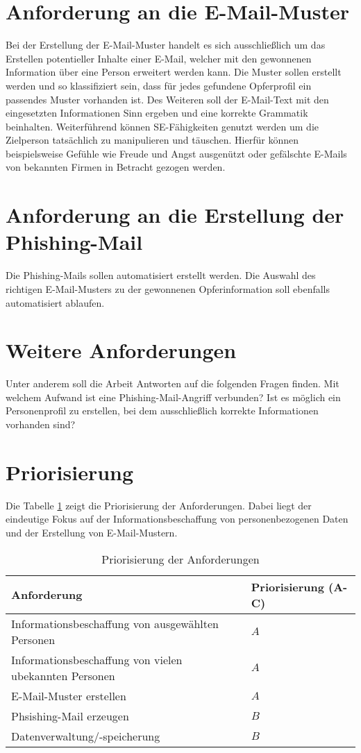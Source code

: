 \section{Anforderung an die E-Mail-Muster}
Bei der Erstellung der E-Mail-Muster handelt es sich ausschließlich um das Erstellen potentieller Inhalte einer E-Mail, welcher mit den gewonnenen Information über eine Person erweitert werden kann. Die Muster sollen erstellt werden und so klassifiziert sein, dass für jedes gefundene Opferprofil ein passendes Muster vorhanden ist. Des Weiteren soll der E-Mail-Text mit den eingesetzten Informationen Sinn ergeben und eine korrekte Grammatik beinhalten. Weiterführend können SE-Fähigkeiten genutzt werden um die Zielperson tatsächlich zu manipulieren und täuschen. Hierfür können beispielsweise Gefühle wie Freude und Angst ausgenützt oder gefälschte E-Mails von bekannten Firmen in Betracht gezogen werden.
	
\section{Anforderung an die Erstellung der Phishing-Mail}
Die Phishing-Mails sollen automatisiert erstellt werden. Die Auswahl des richtigen E-Mail-Musters zu der gewonnenen Opferinformation soll ebenfalls automatisiert ablaufen.

\section{Weitere Anforderungen}
Unter anderem soll die Arbeit Antworten auf die folgenden Fragen finden. Mit welchem Aufwand ist eine Phishing-Mail-Angriff verbunden? Ist es möglich ein Personenprofil zu erstellen, bei dem ausschließlich korrekte Informationen vorhanden sind?
\FloatBarrier

\section{Priorisierung} %
\label{sec:} %
Die Tabelle \ref{tab:prio} zeigt die Priorisierung der Anforderungen. Dabei liegt der eindeutige Fokus auf der Informationsbeschaffung von personenbezogenen Daten und der Erstellung von E-Mail-Mustern.

\begin{table}
	\caption{Priorisierung der Anforderungen}
	\label{tab:prio}
	\begin{center} 
		\begin{tabular}{|l|l|}
			\hline
			Anforderung & Priorisierung (A-C) \\
			\hline
			Informationsbeschaffung von ausgewählten Personen & $ A $ \\
			\hline
			Informationsbeschaffung von vielen ubekannten Personen & $ A $ \\
			\hline
			E-Mail-Muster erstellen & $ A $		\\
			\hline
			Phsishing-Mail erzeugen & $ B $ 	\\
			\hline
			Datenverwaltung/-speicherung & $ B $   \\
			\hline
		\end{tabular}
	\end{center}
\end{table}
